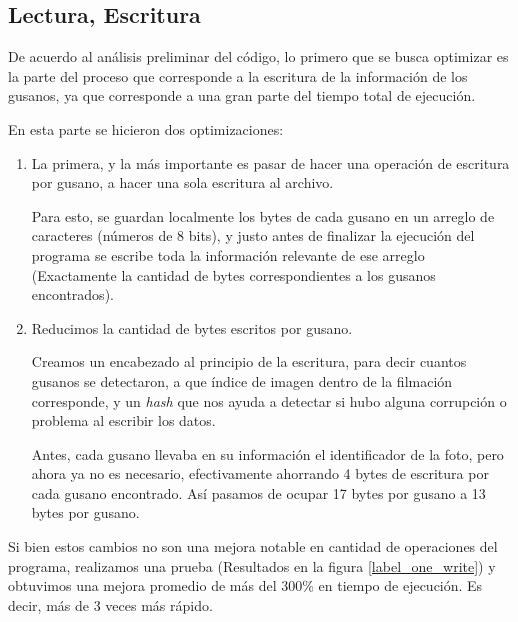 \documentclass{article}
\begin{document}
\subsection{Lectura, Escritura}
De acuerdo al análisis preliminar del código, lo primero que se busca optimizar es la parte del proceso que corresponde a la escritura de la información de los gusanos, ya que corresponde a una gran parte del tiempo total de ejecución.

En esta parte se hicieron dos optimizaciones:
\begin{enumerate}
\item \hspace{0.2cm} La primera, y la más importante es pasar de hacer una operación de escritura por gusano, a hacer una sola escritura al archivo.

\hspace{0.2cm} Para esto, se guardan localmente los bytes de cada gusano en un arreglo de caracteres (números de 8 bits), y justo antes de finalizar la ejecución del programa se escribe toda la información relevante de ese arreglo (Exactamente la cantidad de bytes correspondientes a los gusanos encontrados).

\item \hspace{0.2cm} Reducimos la cantidad de bytes escritos por gusano.

\hspace{0.2cm} Creamos un encabezado al principio de la escritura, para decir cuantos gusanos se detectaron, a que índice de imagen dentro de la filmación corresponde, y un \emph{hash} que nos ayuda a detectar si hubo alguna corrupción o problema al escribir los datos.

\hspace{0.2cm} Antes, cada gusano llevaba en su información el identificador de la foto, pero ahora ya no es necesario, efectivamente ahorrando 4 bytes de escritura por cada gusano encontrado. Así pasamos de ocupar 17 bytes por gusano a 13 bytes por gusano.
\end{enumerate}

Si bien estos cambios no son una mejora notable en cantidad de operaciones del programa, realizamos una prueba (Resultados en la figura \ref{label_one_write}) y obtuvimos una mejora promedio de más del 300\% en tiempo de ejecución. Es decir, más de 3 veces más rápido.
\end{document}
